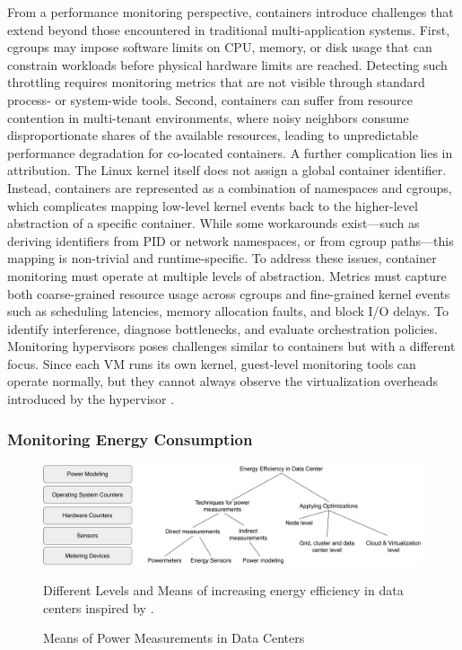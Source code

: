 From a performance monitoring perspective, containers introduce challenges that extend beyond those encountered in traditional multi-application systems. First, cgroups may impose software limits on CPU, memory, or disk usage that can constrain workloads before physical hardware limits are reached. Detecting such throttling requires monitoring metrics that are not visible through standard process- or system-wide tools. Second, containers can suffer from resource contention in multi-tenant environments, where noisy neighbors consume disproportionate shares of the available resources, leading to unpredictable performance degradation for co-located containers.
A further complication lies in attribution. The Linux kernel itself does not assign a global container identifier. Instead, containers are represented as a combination of namespaces and cgroups, which complicates mapping low-level kernel events back to the higher-level abstraction of a specific container. While some workarounds exist—such as deriving identifiers from PID or network namespaces, or from cgroup paths—this mapping is non-trivial and runtime-specific. To address these issues, container monitoring must operate at multiple levels of abstraction. Metrics must capture both coarse-grained resource usage across cgroups and fine-grained kernel events such as scheduling latencies, memory allocation faults, and block I/O delays. To identify interference, diagnose bottlenecks, and evaluate orchestration policies.
Monitoring hypervisors poses challenges similar to containers but with a different focus. Since each VM runs its own kernel, guest-level monitoring tools can operate normally, but they cannot always observe the virtualization overheads introduced by the hypervisor \cite{gregg2020bpf}.

\subsubsection{Monitoring Energy Consumption}
\label{sec:background_monitoring_energy}

\begin{figure}[H]
    \centering
    \includegraphics[scale=0.4]{fig/02/02-energy-overview.pdf}
    \small
    \caption{Means of Power Measurements in Data Centers}
    \label{fig:02-energy-overview}
    \tiny
    Different Levels and Means of increasing energy efficiency in data centers inspired by \cite{khan2018energy}.
\end{figure}

